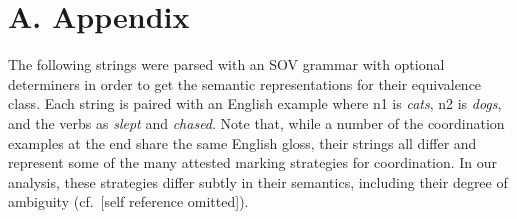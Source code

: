 \documentclass[11pt]{article}
\begin{document}
\section*{A. Appendix}

The following strings were parsed with an SOV grammar with
optional determiners in order to get the semantic representations
for their equivalence class.  Each string is paired with an English
example where n1 is {\it cats}, n2 is {\it dogs}, and the verbs
as {\it slept} and {\it chased}.  Note that, while a number of the
coordination examples at the end share the same English gloss, their
strings all differ and represent some of the many attested marking
strategies for coordination.  In our analysis, these strategies differ
subtly in their semantics, including their degree of ambiguity (cf.~[self
reference omitted]).
\end{document}
